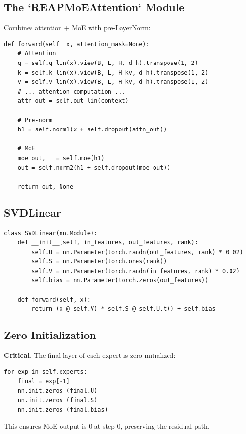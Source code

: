 \subsection{The `REAPMoEAttention` Module}

Combines attention + MoE with pre-LayerNorm:

\begin{lstlisting}
def forward(self, x, attention_mask=None):
    # Attention
    q = self.q_lin(x).view(B, L, H, d_h).transpose(1, 2)
    k = self.k_lin(x).view(B, L, H_kv, d_h).transpose(1, 2)
    v = self.v_lin(x).view(B, L, H_kv, d_h).transpose(1, 2)
    # ... attention computation ...
    attn_out = self.out_lin(context)
    
    # Pre-norm
    h1 = self.norm1(x + self.dropout(attn_out))
    
    # MoE
    moe_out, _ = self.moe(h1)
    out = self.norm2(h1 + self.dropout(moe_out))
    
    return out, None
\end{lstlisting}

\subsection{SVDLinear}

\begin{lstlisting}
class SVDLinear(nn.Module):
    def __init__(self, in_features, out_features, rank):
        self.U = nn.Parameter(torch.randn(out_features, rank) * 0.02)
        self.S = nn.Parameter(torch.ones(rank))
        self.V = nn.Parameter(torch.randn(in_features, rank) * 0.02)
        self.bias = nn.Parameter(torch.zeros(out_features))
    
    def forward(self, x):
        return (x @ self.V) * self.S @ self.U.t() + self.bias
\end{lstlisting}

\subsection{Zero Initialization}

\textbf{Critical.} The final layer of each expert is zero-initialized:

\begin{lstlisting}
for exp in self.experts:
    final = exp[-1]
    nn.init.zeros_(final.U)
    nn.init.zeros_(final.S)
    nn.init.zeros_(final.bias)
\end{lstlisting}

This ensures MoE output is 0 at step 0, preserving the residual path.

